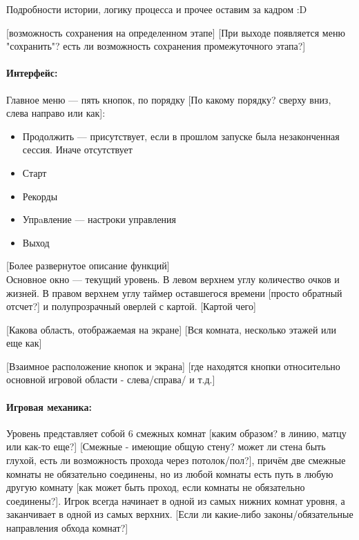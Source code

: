\documentclass[12pt,a4paper]{article}
\begin{document}
Подробности истории, логику процесса и прочее оставим за кадром :D

{\color{red} [возможность сохранения на определенном этапе]} {\color{red} [При выходе появляется меню "сохранить"? есть ли возможность сохранения промежуточного этапа?]}

\paragraph{Интерфейс:}
Главное меню --- пять кнопок, по порядку {\color{red} [По какому порядку? сверху вниз, слева направо или как]}:
\begin{itemize}
\item Продолжить --- присутствует, если в прошлом запуске была незаконченная сессия. Иначе отсутствует
\item Старт
\item Рекорды
\item Упрaвление --- настроки управления
\item Выход
\end{itemize}

{\color{red} [Более развернутое описание функций]}\\

Основное окно --- текущий уровень. В левом верхнем углу количество очков и жизней. В правом верхнем углу таймер оставшегося времени 
{\color{red} [просто обратный отсчет?]}\ans{[Да.]} и полупрозрачный оверлей с картой. {\color{red} [Картой чего]}

{\color{red} [Какова область, отображаемая на экране]} {\color{red} [Вся комната, несколько этажей или еще как]}

{\color{red} [Взаимное расположение кнопок и экрана]} {\color{red} [где находятся кнопки относительно основной игровой  области - слева/справа/ и т.д.]}
 
\paragraph{Игровая механика:}
Уровень представляет собой 6 смежных комнат {\color{red} [каким образом? в линию, матцу или как-то еще?]} {\color{red} [Смежные - имеющие общую стену? может ли стена быть глухой, есть ли возможность прохода через потолок/пол?]}, причём две смежные комнаты не обязательно соединены, но из любой комнаты есть путь в любую другую комнату {\color{red} [как может быть проход, если комнаты не обязательно соединены?]}. Игрок всегда начинает в одной из самых нижних комнат уровня, а заканчивает в одной из самых верхних. 
{\color{red} [Если ли какие-либо законы/обязательные направления обхода комнат?]}
\\
\end{document}
